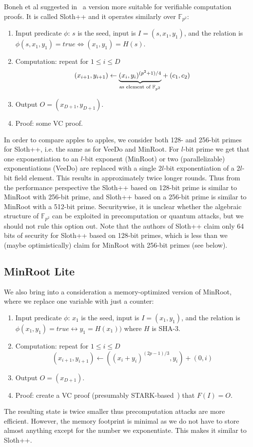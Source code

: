 \documentclass{article}
\begin{document}
Boneh et al suggested in~\cite{DBLP:conf/crypto/BonehBBF18} a version more suitable for verifiable computation proofs. It is called  Sloth++ and it operates similarly over $\mathbb{F}_{p^2}$:
\begin{enumerate}
    \item Input predicate $\phi$: $s$ is the seed, input is $I=(s,x_1,y_1)$, and the relation is $\phi(s,x_1,y_1)=true\Leftrightarrow (x_1,y_1)=H(s)$.
    \item Computation: repeat for $1\leq i\leq D$
    $$
    (x_{i+1},y_{i+1})\leftarrow {\underbrace{(x_i,y_i)^{(p^2+1)/4}}_{\text{as element of }\mathbb{F}_{p^2}}}+(c_1,c_2)\\
    $$
   \item Output $O = (x_{D+1},y_{D+1})$. %
    \item Proof: some VC proof.
\end{enumerate}

In order to compare apples to apples, we consider both 128- and 256-bit primes for Sloth++, i.e. the same as for VeeDo and MinRoot. For $l$-bit prime   we get that one exponentiation to an $l$-bit exponent (MinRoot) or two (parallelizable) exponentiations (VeeDo) are replaced with a single  $2l$-bit exponentiation of a $2l$-bit field element. This results in approximately twice longer rounds. Thus from the performance perspective the Sloth++ based on 128-bit prime is similar to MinRoot with 256-bit prime, and Sloth++ based on a 256-bit prime is similar to  MinRoot with a 512-bit prime.  Securitywise, it is unclear whether the algebraic structure of $\mathbb{F}_{p^2}$ can be exploited in precomputation or quantum attacks, but we should not rule this option out. Note that the authors of Sloth++ claim only 64 bits of security for Sloth++ based on 128-bit primes, which is less than we (maybe optimistically) claim for MinRoot with 256-bit primes (see below).

\subsection{MinRoot Lite}

We also bring into a consideration a memory-optimized version of MinRoot,  where we replace one variable with just a counter:
\begin{enumerate}
    \item Input predicate $\phi$: $x_1$ is the seed, input is $I=(x_1,y_1)$, and the relation is $\phi(x_1,y_1)=true\leftrightarrow y_1=H(x_1))$ where $H$ is SHA-3.
    \item Computation: repeat for $1\leq i\leq D$
    $$
    (x_{i+1},y_{i+1}) \leftarrow   ((x_i+y_i)^{(2p-1)/3},y_i)+(0,i)
    $$
    \item Output $O = (x_{D+1})$.
    \item Proof: create a VC proof (presumably STARK-based~\cite{DBLP:conf/crypto/Ben-SassonBHR19}) that  $F(I) = O$.
\end{enumerate}
The resulting state is twice smaller thus precomputation attacks are more efficient. However, the memory footprint is minimal as we do not have to store almost anything except for the number we exponentiate. This makes it similar to Sloth++.
\end{document}
